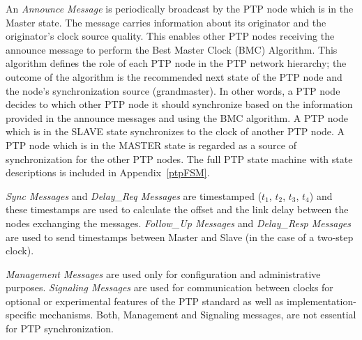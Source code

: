 \documentclass[a4paper, 12pt]{article}
\begin{document}
An \textit{Announce Message} is periodically broadcast by the PTP node which is 
in the Master state. The message carries information about its originator and 
the originator's clock source quality. This enables other PTP nodes receiving 
the announce message to perform the Best Master Clock (BMC) Algorithm. 
This algorithm defines the role of each PTP node in the PTP network hierarchy; 
the outcome of the algorithm is the recommended next state of the PTP node and 
the node's synchronization source (grandmaster). In other words, a PTP node 
decides to which other PTP node it should synchronize based on the information 
provided in the announce messages and using the BMC algorithm. A PTP node which is in 
the SLAVE state synchronizes to the clock of another PTP node. A PTP node 
which is in the MASTER state is regarded as a source of synchronization 
for the other PTP nodes. The full PTP state machine with state descriptions 
is included in Appendix~\ref{ptpFSM}.



\textit{Sync Messages} and \textit{Delay\_Req Messages} are timestamped 
($t_{1}$, $t_{2}$, $t_{3}$, $t_{4}$) and these timestamps are used to calculate 
the offset and the link delay between the nodes exchanging the messages. \textit{Follow\_Up Messages} 
and \textit{Delay\_Resp Messages} are used to send timestamps between Master 
and Slave (in the case of a two-step clock). 

\textit{Management Messages} are used only for configuration and 
administrative purposes. \textit{Signaling Messages} are used for communication between clocks 
for optional or experimental features of the PTP standard as well as implementation-specific 
mechanisms. Both, Management and Signaling messages, are not essential for PTP synchronization.
\end{document}
